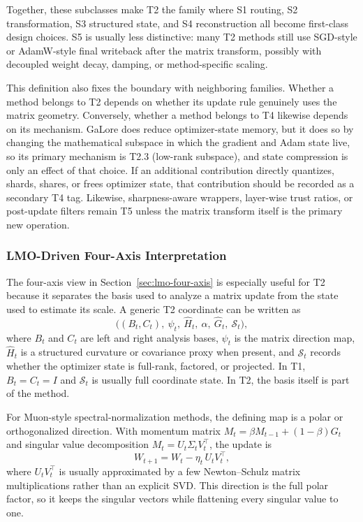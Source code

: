 

Together, these subclasses make T2 the family where S1 routing, S2
transformation, S3 structured state, and S4 reconstruction all become
first-class design choices.  S5 is usually less distinctive: many T2 methods
still use SGD-style or AdamW-style final writeback after the matrix transform,
possibly with decoupled weight decay, damping, or method-specific scaling.

This definition also fixes the boundary with neighboring families.  Whether a
method belongs to T2 depends on whether its update rule genuinely uses the
matrix geometry.  Conversely, whether a method belongs to T4 likewise depends
on its mechanism.  GaLore does reduce optimizer-state memory, but it does so by
changing the mathematical subspace in which the gradient and Adam state live,
so its primary mechanism is T2.3 (low-rank subspace), and state compression is
only an effect of that choice.  If an additional contribution directly
quantizes, shards, shares, or frees optimizer state, that contribution should
be recorded as a secondary T4 tag.  Likewise,
sharpness-aware wrappers, layer-wise trust ratios, or post-update filters
remain T5 unless the matrix transform itself is the primary new operation.

\subsubsection{LMO-Driven Four-Axis Interpretation}
\label{sec:t2-lmo-four-axis}

The four-axis view in Section~\ref{sec:lmo-four-axis} is especially useful for
T2 because it separates the basis used to analyze a matrix update from the
state used to estimate its scale.  A generic T2 coordinate can be written as
\begin{equation}
  \big((B_t,C_t),\ \psi_t,\ \hat{H}_t,\ \alpha,\ \widehat{G}_t,\ \mathcal{S}_t\big),
\end{equation}
where $B_t$ and $C_t$ are left and right analysis bases, $\psi_t$ is the
matrix direction map, $\hat{H}_t$ is a structured curvature or covariance
proxy when present, and $\mathcal{S}_t$ records whether the optimizer state is
full-rank, factored, or projected.  In T1, $B_t=C_t=I$ and $\mathcal{S}_t$ is
usually full coordinate state.  In T2, the basis itself is part of the method.

For Muon-style spectral-normalization methods, the defining map is a polar or
orthogonalized direction.  With momentum matrix
$M_t=\beta M_{t-1}+(1-\beta)G_t$ and singular value decomposition
$M_t=U_t\Sigma_tV_t^\top$, the update is
\begin{equation}
  W_{t+1}=W_t-\eta_t\,U_tV_t^\top ,
  \label{eq:t2-muon-polar}
\end{equation}
where $U_tV_t^\top$ is usually approximated by a few Newton--Schulz matrix
multiplications rather than an explicit SVD.  This direction is the full polar
factor, so it keeps the singular vectors while flattening every singular value
to one.

